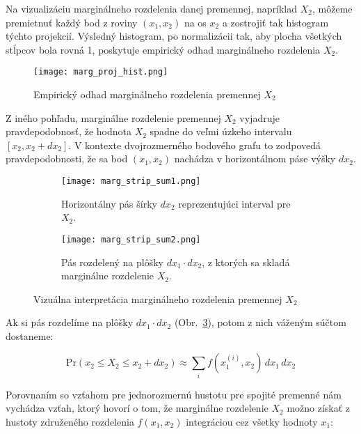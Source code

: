 Na vizualizáciu marginálneho rozdelenia danej premennej, napríklad $X_2$, môžeme premietnuť každý bod z roviny $(x_1, x_2)$ na os $x_2$ a zostrojiť tak histogram týchto projekcií. Výsledný histogram, po normalizácii tak, aby plocha všetkých stĺpcov bola rovná 1, poskytuje empirický odhad marginálneho rozdelenia $X_2$.

\begin{figure}[H] 
    \centering 
    \texttt{[image: marg\_proj\_hist.png]} 
    \caption{Empirický odhad marginálneho rozdelenia premennej $X_2$} 
    \label{fig:margin_proj} 
\end{figure}

Z iného pohľadu, marginálne rozdelenie premennej $X_2$ vyjadruje pravdepodobnosť, že hodnota $X_2$ spadne do veľmi úzkeho intervalu $[x_2, x_2 + dx_2]$. V kontexte dvojrozmerného bodového grafu to zodpovedá pravdepodobnosti, že sa bod $(x_1, x_2)$ nachádza v horizontálnom páse výšky $dx_2$.

\begin{figure}[H]
    \centering
    \begin{subfigure}[b]{0.48\linewidth}
        \centering
        \texttt{[image: marg\_strip\_sum1.png]}
        \caption{Horizontálny pás šírky $dx_2$ reprezentujúci interval pre $X_2$.}
        \label{fig:marg_strip_a}
    \end{subfigure}
    \hfill
    \begin{subfigure}[b]{0.48\linewidth}
        \centering
        \texttt{[image: marg\_strip\_sum2.png]}
        \caption{Pás rozdelený na plôšky $dx_1 \cdot dx_2$, z ktorých sa skladá marginálne rozdelenie $X_2$.}
        \label{fig:marg_strip_b}
    \end{subfigure}
    \caption{Vizuálna interpretácia marginálneho rozdelenia premennej $X_2$}
    \label{fig:marg_strip}
\end{figure}

Ak si pás rozdelíme na plôšky $dx_1 \cdot dx_2$  (Obr.~\ref{fig:marg_strip_b}), potom z nich váženým súčtom dostaneme:

\begin{equation}
\mathrm{Pr}(x_2 \leq X_2 \leq x_2 + dx_2) \approx \sum_i f(x_1^{(i)}, x_2) \, dx_1 \, dx_2
\end{equation}

Porovnaním so vzťahom pre jednorozmernú hustotu pre spojité premenné nám vychádza vzťah, ktorý hovorí o tom, že marginálne rozdelenie $X_2$ možno získať z hustoty združeného rozdelenia $f(x_1, x_2)$ integráciou cez všetky hodnoty $x_1$:

